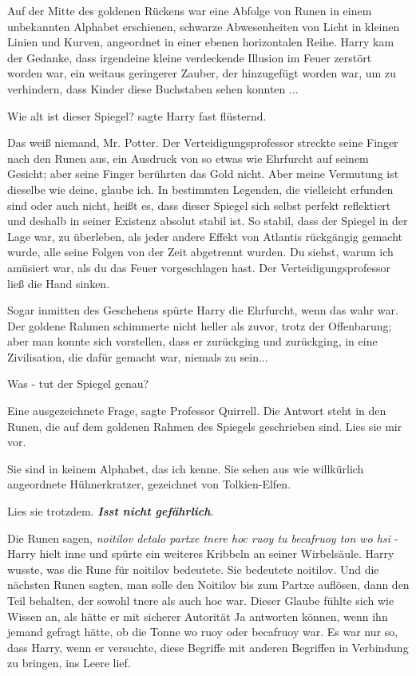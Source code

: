 Auf der Mitte des goldenen Rückens war eine Abfolge von Runen in einem
unbekannten Alphabet erschienen, schwarze Abwesenheiten von Licht in kleinen
Linien und Kurven, angeordnet in einer ebenen horizontalen Reihe. Harry kam der
Gedanke, dass irgendeine kleine verdeckende Illusion im Feuer zerstört worden
war, ein weitaus geringerer Zauber, der hinzugefügt worden war, um zu
verhindern, dass Kinder diese Buchstaben sehen konnten ...

\glqq{}Wie alt ist dieser Spiegel?\grqq{} sagte Harry fast flüsternd.

\glqq{}Das weiß niemand, Mr. Potter.\grqq{} Der Verteidigungsprofessor streckte
seine Finger nach den Runen aus, ein Ausdruck von so etwas wie Ehrfurcht auf
seinem Gesicht; aber seine Finger berührten das Gold nicht. \glqq{}Aber meine
Vermutung ist dieselbe wie deine, glaube ich. In bestimmten Legenden, die
vielleicht erfunden sind oder auch nicht, heißt es, dass dieser Spiegel sich
selbst perfekt reflektiert und deshalb in seiner Existenz absolut stabil ist. So
stabil, dass der Spiegel in der Lage war, zu überleben, als jeder andere Effekt
von Atlantis rückgängig gemacht wurde, alle seine Folgen von der Zeit abgetrennt
wurden. Du siehst, warum ich amüsiert war, als du das Feuer vorgeschlagen
hast.\grqq{} Der Verteidigungsprofessor ließ die Hand sinken.

Sogar inmitten des Geschehens spürte Harry die Ehrfurcht, wenn das wahr war. Der
goldene Rahmen schimmerte nicht heller als zuvor, trotz der Offenbarung; aber
man konnte sich vorstellen, dass er zurückging und zurückging, in eine
Zivilisation, die dafür gemacht war, niemals zu sein...

\glqq{}Was - tut der Spiegel genau?\grqq{}

\glqq{}Eine ausgezeichnete Frage\grqq{}, sagte Professor Quirrell. \glqq{}Die
Antwort steht in den Runen, die auf dem goldenen Rahmen des Spiegels geschrieben
sind. Lies sie mir vor.\grqq{}

\glqq{}Sie sind in keinem Alphabet, das ich kenne. Sie sehen aus wie willkürlich
angeordnete Hühnerkratzer, gezeichnet von Tolkien-Elfen.\grqq{}

\glqq{}Lies sie trotzdem.\textbf{\emph{ Isst nicht gefährlich}}.\grqq{}

\glqq{}Die Runen sagen, \emph{noitilov detalo partxe tnere hoc ruoy tu becafruoy
ton wo hsi} -\grqq{} Harry hielt inne und spürte ein weiteres Kribbeln an seiner
Wirbelsäule. Harry wusste, was die Rune für noitilov bedeutete. Sie bedeutete
noitilov. Und die nächsten Runen sagten, man solle den Noitilov bis zum Partxe
auflösen, dann den Teil behalten, der sowohl tnere als auch hoc war. Dieser
Glaube fühlte sich wie Wissen an, als hätte er mit sicherer Autorität \glqq{}
Ja\grqq{} antworten können, wenn ihn jemand gefragt hätte, ob die Tonne wo ruoy
oder becafruoy war. Es war nur so, dass Harry, wenn er versuchte, diese Begriffe
mit anderen Begriffen in Verbindung zu bringen, ins Leere lief.

